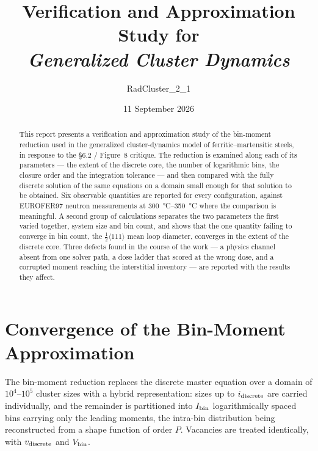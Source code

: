 \documentclass[11pt]{article}
\title{Verification and Approximation Study for\\
       \emph{Generalized Cluster Dynamics}}
\author{RadCluster\_2\_1}
\date{11 September 2026}
\newcommand{\halfp}{$\tfrac{1}{2}\langle111\rangle$}
\begin{document}
\maketitle

\begin{abstract}
This report presents a verification and approximation study of the bin-moment
reduction used in the generalized cluster-dynamics model of
ferritic--martensitic steels, in response to the \S6.2 / Figure~8 critique. The
reduction is examined along each of its parameters --- the extent of the
discrete core, the number of logarithmic bins, the closure order and the
integration tolerance --- and then compared with the fully discrete solution of
the same equations on a domain small enough for that solution to be obtained.
Six observable quantities are reported for every configuration, against EUROFER97
neutron measurements at \SIrange{300}{350}{\celsius} where the comparison is
meaningful. A second group of calculations separates the two parameters the
first varied together, system size and bin count, and shows that the one
quantity failing to converge in bin count, the \halfp{} mean loop diameter,
converges in the extent of the discrete core. Three defects found in the course
of the work --- a physics channel absent from one solver path, a dose ladder
that scored at the wrong dose, and a corrupted moment reaching the interstitial
inventory --- are reported with the results they affect.
\end{abstract}

\tableofcontents

\clearpage

\section{Convergence of the Bin-Moment Approximation}\label{sec:conv}

The bin-moment reduction replaces the discrete master equation over a domain of
$10^4$--$10^5$ cluster sizes with a hybrid representation: sizes up to
$i_{\rm discrete}$ are carried individually, and the remainder is partitioned
into $I_{\rm bin}$ logarithmically spaced bins carrying only the leading
moments, the intra-bin distribution being reconstructed from a shape function of
order $P$. Vacancies are treated identically, with $v_{\rm discrete}$ and
$V_{\rm bin}$.
\end{document}
